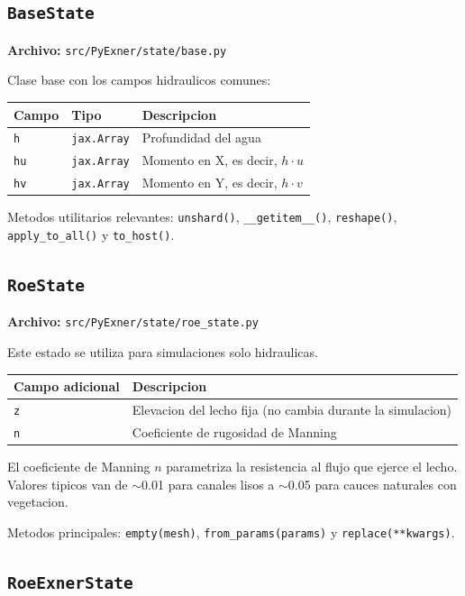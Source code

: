 \documentclass[11pt,a4paper]{article}
\newcommand{\code}[1]{\texttt{#1}}
\begin{document}
\subsection{\code{BaseState}}

\textbf{Archivo:} \code{src/PyExner/state/base.py}

Clase base con los campos hidraulicos comunes:

\begin{tabularx}{\textwidth}{L{3cm}L{3cm}Y}
\toprule
Campo & Tipo & Descripcion \\
\midrule
\code{h} & \code{jax.Array} & Profundidad del agua \\
\code{hu} & \code{jax.Array} & Momento en X, es decir, $h \cdot u$ \\
\code{hv} & \code{jax.Array} & Momento en Y, es decir, $h \cdot v$ \\
\bottomrule
\end{tabularx}

Metodos utilitarios relevantes: \code{unshard()}, \code{\_\_getitem\_\_()}, \code{reshape()},
\code{apply\_to\_all()} y \code{to\_host()}.

\subsection{\code{RoeState}}

\textbf{Archivo:} \code{src/PyExner/state/roe\_state.py}

Este estado se utiliza para simulaciones solo hidraulicas.

\begin{tabularx}{\textwidth}{L{4cm}Y}
\toprule
Campo adicional & Descripcion \\
\midrule
\code{z} & Elevacion del lecho fija (no cambia durante la simulacion) \\
\code{n} & Coeficiente de rugosidad de Manning \\
\bottomrule
\end{tabularx}

El coeficiente de Manning $n$ parametriza la resistencia al flujo que ejerce el lecho. Valores
tipicos van de $\sim$0.01 para canales lisos a $\sim$0.05 para cauces naturales con vegetacion.

Metodos principales: \code{empty(mesh)}, \code{from\_params(params)} y \code{replace(**kwargs)}.

\subsection{\code{RoeExnerState}}
\end{document}

